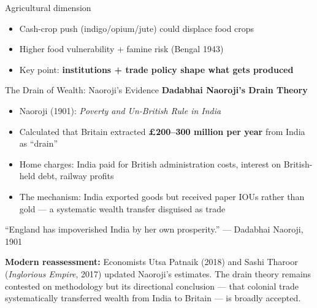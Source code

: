 \documentclass[
  ignorenonframetext,
  aspectratio=169,
]{beamer}
\makeatletter
\providecommand{\tightlist}{%
  \setlength{\itemsep}{0pt}\setlength{\parskip}{0pt}}
\let\quarto@originallabel\label
\DeclareRobustCommand*{\label}[1]{\quarto@originallabel{#1}}
\makeatother
\begin{document}
\begin{frame}{Agricultural dimension}
\label{agricultural-dimension}
\begin{itemize}
\tightlist
\item
  Cash-crop push (indigo/opium/jute) could displace food crops
\item
  Higher food vulnerability + famine risk (Bengal 1943)
\item
  Key point: \textbf{institutions + trade policy shape what gets
  produced}
\end{itemize}
\end{frame}

\begin{frame}{The Drain of Wealth: Naoroji's Evidence}
\label{the-drain-of-wealth-naorojis-evidence}
\textbf{Dadabhai Naoroji's Drain Theory}

\begin{itemize}
\tightlist
\item
  Naoroji (1901): \emph{Poverty and Un-British Rule in India}
\item
  Calculated that Britain extracted \textbf{£200--300 million per year}
  from India as ``drain''
\item
  Home charges: India paid for British administration costs, interest on
  British-held debt, railway profits
\item
  The mechanism: India exported goods but received paper IOUs rather
  than gold --- a systematic wealth transfer disguised as trade
\end{itemize}

``England has impoverished India by her own prosperity.'' --- Dadabhai
Naoroji, 1901

\textbf{Modern reassessment:} Economists Utsa Patnaik (2018) and Sashi
Tharoor (\emph{Inglorious Empire}, 2017) updated Naoroji's estimates.
The drain theory remains contested on methodology but its directional
conclusion --- that colonial trade systematically transferred wealth
from India to Britain --- is broadly accepted.
\end{frame}
\end{document}
